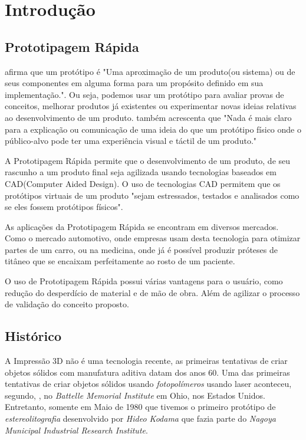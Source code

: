 \section{Introdução}

\newpage

\subsection{Prototipagem Rápida}
\citet{rapidproto2010} afirma que um protótipo é "Uma aproximação de um produto(ou sistema)
ou de seus componentes em alguma forma para um propósito definido em sua implementação.".
Ou seja, podemos usar um protótipo para avaliar provas de conceitos, melhorar produtos
já existentes ou experimentar novas ideias relativas ao desenvolvimento de um produto.
\citet{rapidproto2010} também acrescenta que "Nada é mais claro para a explicação ou comunicação
de uma ideia do que um protótipo físico onde o público-alvo pode ter uma experiência visual
e táctil de um produto."

A Prototipagem Rápida permite que o desenvolvimento de um produto, de seu rascunho
a um produto final seja agilizada usando tecnologias baseados em CAD(Computer Aided Design).
O uso de tecnologias CAD permitem que os protótipos virtuais de um produto
\citet{rapidproto2010} "sejam estressados, testados e analisados como se eles fossem protótipos físicos".

As aplicações da Prototipagem Rápida se encontram em diversos mercados. Como o mercado
automotivo, onde empresas usam desta tecnologia para otimizar partes de um carro, ou na medicina,
onde já é possível produzir próteses de titâneo que se encaixam perfeitamente ao rosto de um paciente.

O uso de Prototipagem Rápida possui várias vantagens para o usuário, como redução do desperdício
de material e de mão de obra. Além de agilizar o processo de validação do conceito proposto.

\subsection{Histórico}
A Impressão 3D não é uma tecnologia recente, as primeiras
tentativas de criar objetos sólidos com manufatura aditiva datam dos anos 60.
Uma das primeiras tentativas de criar objetos sólidos usando \textit{fotopolímeros} usando laser
aconteceu, segundo, \citet{terry2016}, no \textit{Battelle Memorial Institute} em Ohio, nos Estados Unidos.
Entretanto, somente em Maio de 1980 que tivemos o primeiro protótipo de \textit{estereolitografia}
desenvolvido por \textit{Hideo Kodama} que fazia parte do \textit{Nagoya Municipal Industrial Research Institute}.


